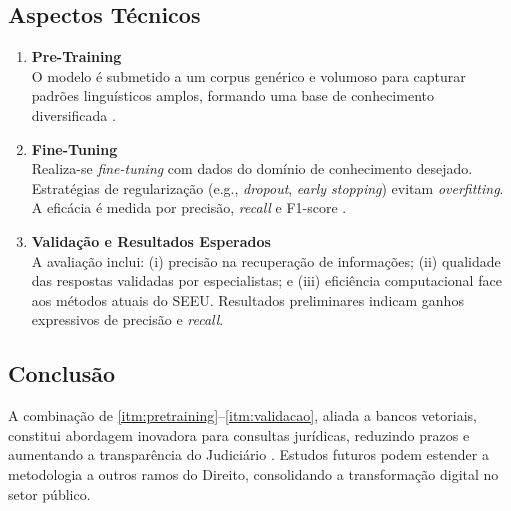 \subsection{Aspectos Técnicos}
\begin{enumerate}[label=\textbf{2.\arabic*}, leftmargin=*]
  \item \textbf{Pre-Training}\label{itm:pretraining}\\
        O modelo é submetido a um corpus genérico e volumoso para capturar
        padrões linguísticos amplos, formando uma base de conhecimento
        diversificada \cite{naveeda2024comprehensive}.
  
  \item \textbf{Fine-Tuning}\label{itm:finetuning}\\
        Realiza-se \emph{fine-tuning} com dados do domínio de conhecimento desejado.
        Estratégias de regularização (e.g., \textit{dropout}, \textit{early
        stopping}) evitam \textit{overfitting}. A eficácia é medida por
        precisão, \textit{recall} e F1-score
        \cite{yue2023disclawllm,lai2023lawm}.

  
  \item \textbf{Validação e Resultados Esperados}\label{itm:validacao}\\
        A avaliação inclui: (i) precisão na recuperação de informações;
        (ii) qualidade das respostas validadas por especialistas; e
        (iii) eficiência computacional face aos métodos atuais do SEEU.
        Resultados preliminares indicam ganhos expressivos de precisão e
        \textit{recall}.
\end{enumerate}

\subsection{Conclusão}
A combinação de \ref{itm:pretraining}–\ref{itm:validacao}, aliada a bancos
vetoriais, constitui abordagem inovadora para consultas jurídicas, reduzindo
prazos e aumentando a transparência do Judiciário
\cite{belarmino2025aplicacao,divald2021eformalization}. Estudos futuros podem
estender a metodologia a outros ramos do Direito, consolidando a transformação
digital no setor público.


